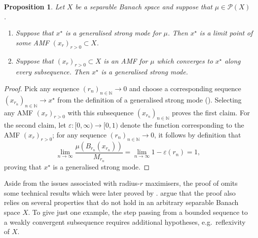 \documentclass[11pt]{article}
\newcommand*{\cball}[2]{B_{#2}(#1)}
\newcommand*{\Naturals}{\mathbb{N}}
\newcommand*{\prob}[1]{\mathscr{P}(#1)}
\newcommand*{\crcdf}[2]{\mu(\cball{#1}{#2})}
\theoremstyle{plain}
\newtheorem{proposition}[theorem]{Proposition}
\theoremstyle{definition}
\numberwithin{equation}{section}
\numberwithin{figure}{section}
\numberwithin{table}{section}
\begin{document}
\begin{proposition}
	\label{prop:generalised_strong_AMF}
	Let $X$ be a separable Banach space and suppose that $\mu \in \prob{X}$.
	\begin{enumerate}[label=(\alph*)]
		\item Suppose that $x^{\star}$ is a generalised strong mode for $\mu$.
		Then $x^\star$ is a limit point of some AMF $(x_{r})_{r > 0} \subset X$.

		\item Suppose that $(x_{r})_{r > 0} \subset X$ is an AMF for $\mu$ which converges to $x^{\star}$ along every subsequence.
		Then $x^{\star}$ is a generalised strong mode.
	\end{enumerate}
\end{proposition}

\begin{proof}
	Pick any sequence $(r_{n})_{n \in \Naturals} \to 0$ and choose a corresponding sequence $(x_{r_n})_{n \in \Naturals} \to x^{\star}$ from the definition of a generalised strong mode ().
	Selecting any AMF $(x_{r})_{r > 0}$ with this subsequence $(x_{r_n})_{n \in \Naturals}$ proves the first claim.
	For the second claim, let $\varepsilon \colon [0, \infty) \to [0, 1)$ denote the function corresponding to the AMF $(x_{r})_{r > 0}$;
	for any sequence $(r_{n})_{n \in \Naturals} \to 0$, it follows by definition that
	\begin{equation*}
		\lim_{n \to \infty} \frac{\crcdf{x_{r_n}}{r_n}}{M_{r_n}} = \lim_{n \to \infty} 1 - \varepsilon(r_n) = 1,
	\end{equation*}
	proving that $x^\star$ is a generalised strong mode.
\end{proof}

Aside from the issues associated with radius-$r$ maximisers, the proof of \citet{DashtiLawStuartVoss2013} omits some technical results which were later proved by \citet{Kretschmann2019}.
\citet{KlebanovWacker2022} argue that the proof also relies on several properties that do not hold in an arbitrary separable Banach space $X$.
To give just one example, the step passing from a bounded sequence to a weakly convergent subsequence requires additional hypotheses, e.g.\ reflexivity of $X$.
\end{document}
